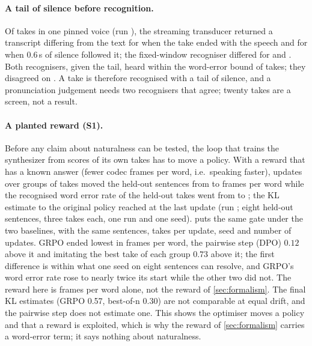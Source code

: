 \paragraph{A tail of silence before recognition.}
Of \TakesN{} takes in one pinned voice (run ), the streaming transducer returned a transcript differing from the text for
\FirstRecogniserRaw{} when the take ended with the speech and for \FirstRecogniserTailed{} when 0.6\,s of silence followed it; the fixed-window
recogniser differed for \SecondRecogniserRaw{} and \SecondRecogniserTailed{}. Both recognisers, given the tail, heard within the word-error bound
\TakesAgreed{} of \TakesN{} takes; they disagreed on \TakesContested{}. A take is therefore recognised with a tail of silence, and a pronunciation judgement needs two recognisers that agree; twenty takes are a screen, not a result.

\paragraph{A planted reward (S1).}
Before any claim about naturalness can be tested, the loop that trains the synthesizer from scores of its own takes has to move a policy. With a reward that has a known answer (fewer codec frames per word, i.e.\ speaking faster), \GateUpdates{} updates over groups of \GateGroup{} takes moved the held-out sentences from \GateFramesBefore{} to \GateFramesAfter{} frames per word
while the recognised word error rate of the held-out takes went from \GateWerBefore{} to \GateWerAfter{}; the KL estimate to the original policy reached \GateKlLast{} at the last update (run ; eight held-out sentences, three takes each, one run and one seed).  puts the same gate under the two baselines, with the same sentences, takes per update, seed and number of updates.
GRPO ended lowest in frames per word, the pairwise step (DPO) \(0.12\) above it and imitating the best take of each group \(0.73\) above it; the first difference is within what one seed on eight sentences can resolve, and GRPO's word error rate rose to nearly twice its start while the other two did not. The reward here is frames per word alone, not the reward of \cref{sec:formalism}.
The final KL estimates (GRPO 0.57, best-of-n 0.30) are not comparable at equal drift, and the pairwise step does not estimate one. This shows the optimiser moves a policy and that a reward is exploited, which is why the reward of \cref{sec:formalism} carries a word-error term; it says nothing about naturalness.

